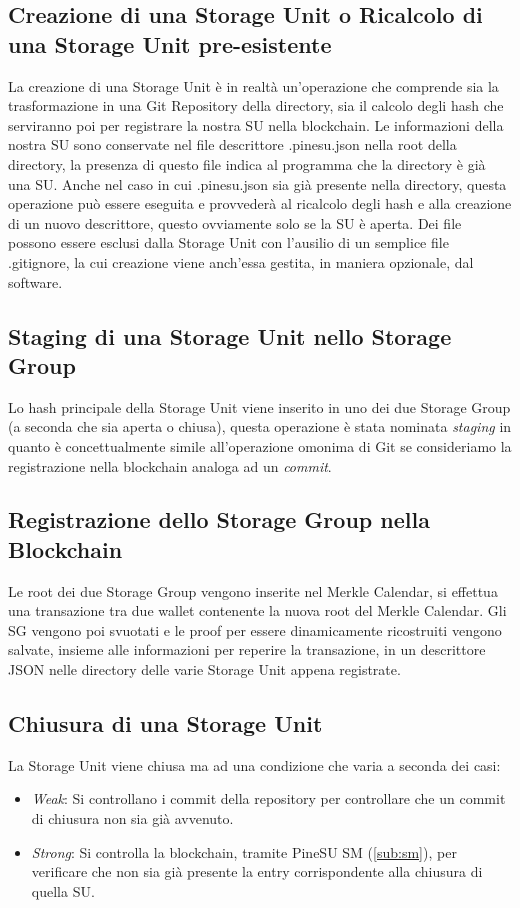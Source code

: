 \subsection{Creazione di una Storage Unit o Ricalcolo di una Storage Unit pre-esistente}
La creazione di una Storage Unit è in realtà un’operazione che comprende sia la trasformazione in una Git Repository della directory, sia il calcolo degli hash che serviranno poi per registrare la nostra SU nella blockchain. Le informazioni della nostra SU sono conservate nel file descrittore \textsf{.pinesu.json} nella root della directory, la presenza di questo file indica al programma che la directory è già una SU. Anche nel caso in cui .pinesu.json sia già presente nella directory, questa operazione può essere eseguita e provvederà al ricalcolo degli hash e alla creazione di un nuovo descrittore, questo ovviamente solo se la SU è aperta.
Dei file possono essere esclusi dalla Storage Unit con l’ausilio di un semplice file \textsf{.gitignore}, la cui creazione viene anch’essa gestita, in maniera opzionale, dal software.

\subsection{Staging di una Storage Unit nello Storage Group}
\label{sub:stage}
Lo hash principale della Storage Unit viene inserito in uno dei due Storage Group (a seconda che sia aperta o chiusa), questa operazione è stata nominata \emph{staging} in quanto è concettualmente simile all’operazione omonima di Git se consideriamo la registrazione nella blockchain analoga ad un \emph{commit}.

\subsection{Registrazione dello Storage Group nella Blockchain}
Le root dei due Storage Group vengono inserite nel Merkle Calendar, si effettua una transazione tra due wallet contenente la nuova root del Merkle Calendar.
Gli SG vengono poi svuotati e le proof per essere dinamicamente ricostruiti vengono salvate, insieme alle informazioni per reperire la transazione, in un descrittore JSON nelle directory delle varie Storage Unit appena registrate.

\subsection{Chiusura di una Storage Unit}
La Storage Unit viene chiusa ma ad una condizione che varia a seconda dei casi:
\begin{itemize}
    \item \emph{Weak}: Si controllano i commit della repository per controllare che un commit di chiusura non sia già avvenuto.
    \item \emph{Strong}: Si controlla la blockchain, tramite PineSU SM (\autoref{sub:sm}), per verificare che non sia già presente la entry corrispondente alla chiusura di quella SU.
\end{itemize}


